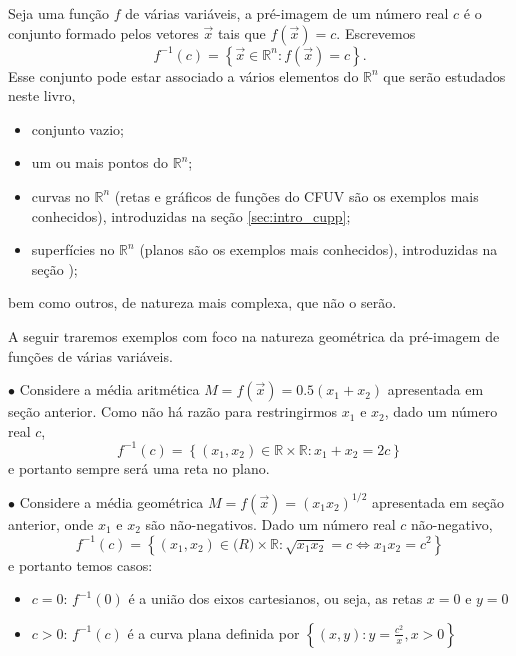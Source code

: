 Seja uma função $f$ de várias variáveis, a pré-imagem de um número real $c$ é o conjunto formado pelos vetores $\vec{x}$ tais que $f(\vec{x}) = c$. Escrevemos
\begin{equation}
f^{-1}(c) = \left\{ \vec{x} \in \mathbb{R}^n : f(\vec{x}) = c \right\}.
\end{equation}
Esse conjunto pode estar associado a vários elementos do $\mathbb{R}^n$ que serão estudados neste livro,
\begin{itemize}
\item{conjunto vazio;}
\item{um ou mais pontos do $\mathbb{R}^n$;}
\item{curvas no $\mathbb{R}^n$ (retas e gráficos de funções do CFUV são os exemplos mais conhecidos), introduzidas na seção \ref{sec:intro_cupp};}
\item{superfícies no $\mathbb{R}^n$ (planos são os exemplos mais conhecidos), introduzidas na seção );}
\end{itemize}
bem como outros, de natureza mais complexa, que não o serão.

 \medskip

A seguir traremos exemplos com foco na natureza geométrica da pré-imagem de funções de várias variáveis.

$\bullet$  Considere a média aritmética $M = f\left(\vec{x}\right) = 0.5(x_1+x_2)$ apresentada em seção anterior. Como não há razão para restringirmos $x_1$ e $x_2$, dado um número real $c$,
\begin{equation}
f^{-1}(c) = \left\{ (x_1,x_2) \in \mathbb{R} \times \mathbb{R} : x_1 + x_2 = 2c \right\}
\end{equation}
e portanto sempre será uma reta no plano.

$\bullet$  Considere a média geométrica $M = f\left(\vec{x}\right) = (x_1 x_2)^{1/2}$ apresentada em seção anterior, onde $x_1$ e $x_2$ são não-negativos. Dado  um número real $c$ não-negativo,
\begin{equation}
f^{-1}(c) = \left\{ (x_1,x_2) \in \mathbb(R)\times \mathbb{R} : \sqrt{x_1x_2} = c \Leftrightarrow x_1 x_2 = c^2  \right\}
\end{equation}
e portanto temos casos:
\begin{itemize}
\item[(i)]{$c = 0$:  $f^{-1}(0)$ é a união dos eixos cartesianos, ou seja, as retas $x=0$ e $y=0$}
\item[(ii)]{$ c > 0 $:  $f^{-1}(c)$ é a curva plana definida por
$\left\{ (x,y) : y = \frac{c^2}{x}, x > 0  \right\} $}
\end{itemize}


